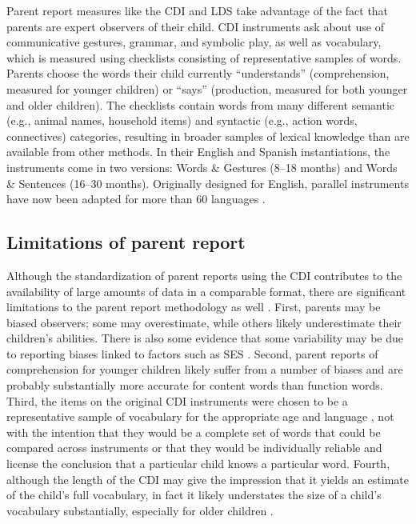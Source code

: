 \documentclass[man,noapacite]{apa}
\begin{document}
Parent report measures like the CDI and LDS take advantage of the fact that parents are expert observers of their child. CDI instruments ask about use of communicative gestures, grammar, and symbolic play, as well as vocabulary, which is measured using checklists consisting of representative samples of words. Parents choose the words their child currently ``understands'' (comprehension, measured for younger children) or ``says'' (production, measured for both younger and older children).  The checklists contain words from many different semantic (e.g., animal names, household items) and syntactic (e.g., action words, connectives) categories, resulting in broader samples of lexical knowledge than are available from other methods. In their English and Spanish instantiations, the instruments come in two versions: Words \& Gestures (8--18 months) and Words \& Sentences (16--30 months). Originally designed for English, parallel instruments have now been adapted for more than 60 languages \cite{dale2011}.

\subsection{Limitations of parent report}

Although the standardization of parent reports using the CDI contributes to the availability of large amounts of data in a comparable format, there are significant limitations to the parent report methodology as well \cite{tomasello1994,feldman2000}. First, parents may be biased observers; some may overestimate, while others likely underestimate their children's abilities. There is also some evidence that some variability may be due to reporting biases linked to factors such as SES \cite{feldman2000,fenson2000,feldman2005}. Second, parent reports of comprehension for younger children likely suffer from a number of biases and are probably substantially more accurate for content words than function words. Third, the items on the original CDI instruments were chosen to be a representative sample of vocabulary for the appropriate age and language \cite{fenson1994}, not with the intention that they would be a complete set of words that could be compared across instruments or that they would be individually reliable and license the conclusion that a particular child knows a particular word. Fourth, although the length of the CDI may give the impression that it yields an estimate of the child's full vocabulary, in fact it likely understates the size of a child's vocabulary substantially, especially for older children \cite{mayor2011}.
\end{document}
